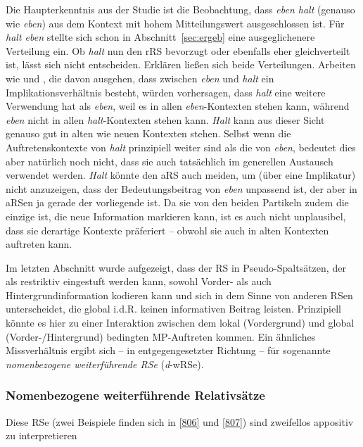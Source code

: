 Die Haupterkenntnis aus der Studie ist die Beobachtung, dass \textit{eben halt} (genauso wie \textit{eben}) aus dem Kontext mit hohem Mitteilungswert ausgeschlossen ist. Für \textit{halt eben} stellte sich schon in Abschnitt~\ref{sec:ergeb} eine ausgeglichenere Verteilung ein. Ob \textit{halt} nun den rRS bevorzugt oder ebenfalls eher gleichverteilt ist, lässt sich nicht entscheiden. Erklären ließen sich beide Verteilungen. Arbeiten wie \citet{Thurmair1989} und \citet{Ickler1994}, die davon ausgehen, dass zwischen \textit{eben} und \textit{halt} ein Implikationsverhältnis besteht, würden vorhersagen, dass \textit{halt} eine weitere Verwendung hat als \textit{eben}, weil es in allen \textit{eben}-Kontexten stehen kann, während \textit{eben} nicht in allen \textit{halt}-Kontexten stehen kann. \textit{Halt} kann aus dieser Sicht genauso gut in alten wie neuen Kontexten stehen. Selbst wenn die Auftretenskontexte von \textit{halt} prinzipiell weiter sind als die von \textit{eben}, bedeutet dies aber natürlich noch nicht, dass sie auch tatsächlich im generellen Austausch verwendet werden. \textit{Halt} könnte den aRS auch meiden, um (über eine Implikatur) nicht anzuzeigen, dass der Bedeutungsbeitrag von \textit{eben} unpassend ist, der aber in aRSen ja gerade der vorliegende ist. Da sie von den beiden Partikeln zudem die einzige ist, die neue Information markieren kann, ist es auch nicht unplausibel, dass sie derartige Kontexte präferiert – obwohl sie auch in alten Kontexten auftreten kann.

Im letzten Abschnitt wurde aufgezeigt, dass der RS in Pseudo-Spaltsätzen, der als restriktiv eingestuft werden kann, sowohl Vorder- als auch Hintergrundinformation kodieren kann und sich in dem Sinne von anderen RSen unterscheidet, die global i.d.R. keinen informativen Beitrag leisten. Prinzipiell könnte es hier zu einer Interaktion zwischen dem lokal (Vordergrund) und global (Vorder-\slash Hintergrund) bedingten MP-Auftreten kommen. Ein ähnliches Missverhältnis ergibt sich – in entgegengesetzter Richtung – für sogenannte  \textit{nomenbezogene weiterführende RSe} (\textit{d}-wRSe).

\subsubsection{Nomenbezogene weiterführende Relativsätze}
\label{sec:nwrs}
Diese RSe (zwei Beispiele finden sich in \ref{806} und \ref{807}) sind zweifellos appositiv zu interpretieren

